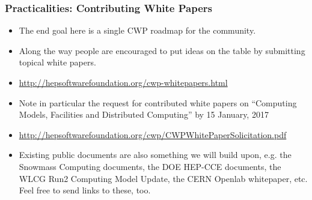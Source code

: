\begin{frame}
\frametitle{Practicalities: Contributing White Papers}

\begin{itemize}
\item The end goal here is a single CWP roadmap for the community. 
\item Along the way people are encouraged to put ideas on the table by submitting topical white papers. 
\item \url{http://hepsoftwarefoundation.org/cwp-whitepapers.html}
\item Note in particular the request for contributed white papers on ``Computing Models, Facilities and Distributed Computing''
by 15 January, 2017
\item \url{http://hepsoftwarefoundation.org/cwp/CWPWhitePaperSolicitation.pdf}
\item Existing public documents are also something we will build upon, e.g. the Snowmass Computing documents, the DOE HEP-CCE documents, the WLCG Run2 Computing Model Update, the CERN Openlab whitepaper, etc. Feel free to send links to these, too.
\end{itemize}

\end{frame}


